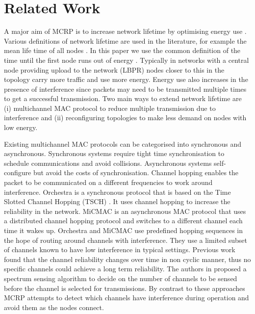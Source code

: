 \section{Related Work}
\label{RelatedWork}

 A major aim of MCRP is to increase network lifetime by optimising energy use \added{[r]}.  Various definitions of network lifetime are used in the literature, for example the mean life time of all nodes \added{[r]}.  In this paper we use the common definition of the time until the first node runs out of energy \added{[r]}.  Typically in networks with a central node providing upload to the network (LBPR) nodes closer to this in the topology carry more traffic and use more energy.  Energy use also increases in the presence of interference since packets may need to be transmitted multiple times to get a successful transmission. Two main ways to extend network lifetime are (i) multichannel MAC protocol to reduce multiple transmission due to interference and (ii) reconfiguring topologies to make less demand on nodes with low energy.

Existing multichannel MAC protocols can be categorised into synchronous and asynchronous. Synchronous systems require tight time synchronisation to schedule communications and avoid collisions. Asynchronous systems self-configure but avoid the costs of synchronisation.
Channel hopping enables the packet to be communicated on a different frequencies to work around interference.  Orchestra \cite{orchestra} is a synchronous protocol that is based on the Time Slotted Channel Hopping (TSCH) \cite{tsch}. It uses channel hopping to increase the reliability in the network.  MiCMAC \cite{micmac} is an asynchronous MAC protocol that uses a distributed channel hopping protocol and switches to a different channel each time it wakes up.  Orchestra and MiCMAC use predefined hopping sequences in the hope of routing around channels with interference.  They use a limited subset of channels known to have low interference in typical settings. Previous work~\cite{homearea,oppcast} found that the channel reliability changes over time in non cyclic manner, thus no specific channels could achieve a long term reliability. The authors in \cite{energyluca} proposed a spectrum sensing algorithm to decide on the number of channels to be sensed before the channel is selected for transmissions.  By contrast to these approaches MCRP attempts to detect which channels have interference during operation and avoid them as the nodes connect.

